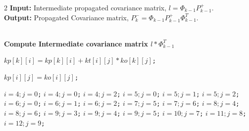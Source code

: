 \documentclass[journal]{IEEEtran}
\begin{document}

\begin{tcolorbox}[float*=!tbph]
\begin{algorithm}[H]
\caption{Efficient propagation of the error covariance matrix (part b)}
\begin{multicols}{2}
 \hspace*{\algorithmicindent} \textbf{Input:} Intermediate propagated covariance matrix, $l=\Phi_{k-1} P_{k-1}^+$.  \\
 \hspace*{\algorithmicindent} \textbf{Output:} Propagated Covariance matrix, $P_k^-=\Phi_{k-1} P_{k-1}^+\Phi_{k-1}^T$.
\begin{algorithmic}[1]
\\\textbf{\color{Red}Compute Intermediate covariance matrix $l*\Phi_{k-1}^T$}\\

        \State \texttt{$kp[k][i] = kp[k][i] + kt[i][j] * ko[k][j]$;}
      \EndFor
\EndFunction
\\

        \State \texttt{$kp[i][j] = ko[i][j]$;}
      \EndFor
      \EndFor

\State \texttt{$i=4;j=0$;}
\State \texttt{$i=4;j=0$;}
\State \texttt{$i=4;j=2$;}
\State \texttt{$i=5;j=0$;}
\State \texttt{$i=5;j=1$;}
\State \texttt{$i=5;j=2$;}
\State \texttt{$i=6;j=0$;}
\State \texttt{$i=6;j=1$;}
\State \texttt{$i=6;j=2$;}
\State \texttt{$i=7;j=5$;}
\State \texttt{$i=7;j=6$;}
\State \texttt{$i=8;j=4$;}
\State \texttt{$i=8;j=6$;}
\State \texttt{$i=9;j=3$;}
\State \texttt{$i=9;j=4$;}
\State \texttt{$i=9;j=5$;}
\State \texttt{$i=10;j=7$;}
\State \texttt{$i=11;j=8$;}
\State \texttt{$i=12;j=9$;}
\EndFunction
\end{algorithmic}
\end{multicols}
\label{inter2}
\end{algorithm}

\end{tcolorbox}
\end{document}
